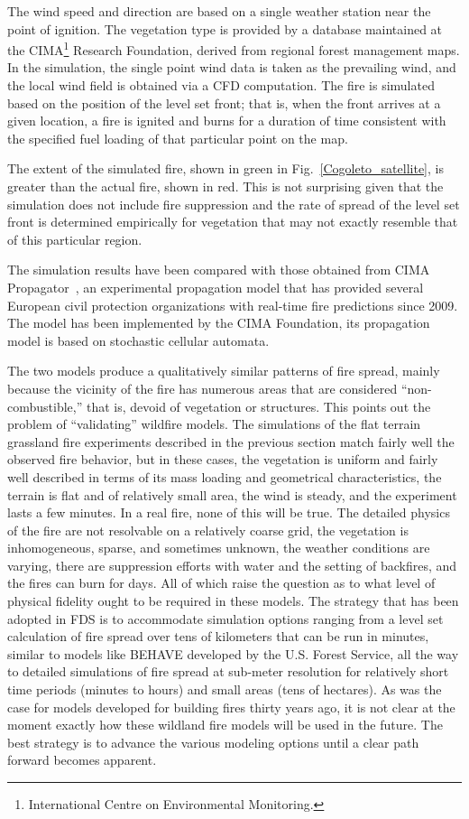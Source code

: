 \documentclass[journal,article,atmosphere,submit,moreauthors,pdftex]{Definitions/mdpi}
\begin{document}
The wind speed and direction are based on a single weather station near the point of ignition. The vegetation type is provided by a database maintained at the CIMA\footnote{International Centre on Environmental Monitoring.} Research Foundation, derived from regional forest management maps. In the simulation, the single point wind data is taken as the prevailing wind, and the local wind field is obtained via a CFD computation. The fire is simulated based on the position of the level set front; that is, when the front arrives at a given location, a fire is ignited and burns for a duration of time consistent with the specified fuel loading of that particular point on the map. 

The extent of the simulated fire, shown in green in Fig.~\ref{Cogoleto_satellite}, is greater than the actual fire, shown in red. This is not surprising given that the simulation does not include fire suppression and the rate of spread of the level set front is determined empirically for vegetation that may not exactly resemble that of this particular region. 

The simulation results have been compared with those obtained from CIMA Propagator~\cite{Trucchia:2020}, an experimental propagation model that has provided several European civil protection organizations with real-time fire predictions since 2009. The model has been implemented by the CIMA Foundation, its propagation model is based on stochastic cellular automata.

The two models produce a qualitatively similar patterns of fire spread, mainly because the vicinity of the fire has numerous areas that are considered ``non-combustible,'' that is, devoid of vegetation or structures. This points out the problem of ``validating'' wildfire models. The simulations of the flat terrain grassland fire experiments described in the previous section match fairly well the observed fire behavior, but in these cases, the vegetation is uniform and fairly well described in terms of its mass loading and geometrical characteristics, the terrain is flat and of relatively small area, the wind is steady, and the experiment lasts a few minutes. In a real fire, none of this will be true. The detailed physics of the fire are not resolvable on a relatively coarse grid, the vegetation is inhomogeneous, sparse, and sometimes unknown, the weather conditions are varying, there are suppression efforts with water and the setting of backfires, and the fires can burn for days. All of which raise the question as to what level of physical fidelity ought to be required in these models. The strategy that has been adopted in FDS is to accommodate simulation options ranging from a level set calculation of fire spread over tens of kilometers that can be run in minutes, similar to models like BEHAVE developed by the U.S. Forest Service, all the way to detailed simulations of fire spread at sub-meter resolution for relatively short time periods (minutes to hours) and small areas (tens of hectares). As was the case for models developed for building fires thirty years ago, it is not clear at the moment exactly how these wildland fire models will be used in the future. The best strategy is to advance the various modeling options until a clear path forward becomes apparent.
\end{document}
